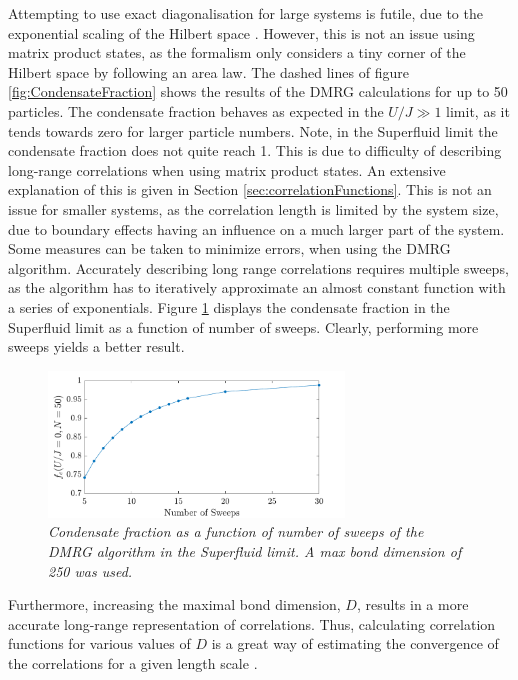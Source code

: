Attempting to use exact diagonalisation for large systems is futile, due to the exponential scaling of the Hilbert space \cite{Vidal2003}. However, this is not an issue using matrix product states, as the formalism only considers a tiny corner of the Hilbert space by following an area law. 
The dashed lines of figure \ref{fig:CondensateFraction} shows the results of the DMRG calculations for up to 50 particles. The condensate fraction behaves as expected in the $U/J \gg 1$ limit, as it tends towards zero for larger particle numbers. Note, in the Superfluid limit the condensate fraction does not quite reach 1. This is due to difficulty of describing long-range correlations when using matrix product states. An extensive explanation of this is given in Section \ref{sec:correlationFunctions}.
This is not an issue for smaller systems, as the correlation length is limited by the system size, due to boundary effects having an influence on a much larger part of the system. \\
Some measures can be taken to minimize errors, when using the DMRG algorithm. Accurately describing long range correlations requires multiple sweeps, as the algorithm has to iteratively approximate an almost constant function with a series of exponentials. Figure \ref{fig:sweepdependence} displays the condensate fraction in the Superfluid limit as a function of number of sweeps. Clearly, performing more sweeps yields a better result.
\begin{figure}[h!]
    \centering
    \includegraphics[width=0.7\textwidth]{Figures/CFsweeps.pdf}
    \caption{\textit{Condensate fraction as a function of number of sweeps of the DMRG algorithm in the Superfluid limit. A max bond dimension of 250 was used.}}
    \label{fig:sweepdependence}
\end{figure}
Furthermore, increasing the maximal bond dimension, $D$, results in a more accurate long-range representation of correlations. Thus, calculating correlation functions for various values of $D$ is a great way of estimating the convergence of the correlations for a given length scale \cite{schollwock}.\\

